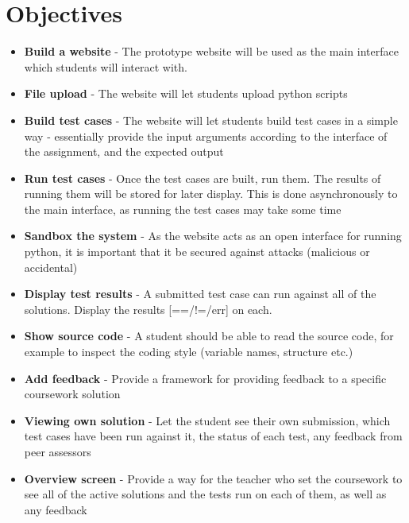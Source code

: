 \documentclass[a4paper,11pt]{report}
\newcommand{\objv}[2]{\item \textbf{#1} - #2}
\begin{document}
\section{Objectives}
\begin{itemize}
 \objv{Build a website}{The prototype website will be used as the main interface which students will interact with.}
 \objv{File upload}{The website will let students upload python scripts}
 \objv{Build test cases}{The website will let students build test cases in a simple way - essentially provide the input arguments according to the interface of the assignment, and the expected output}
 \objv{Run test cases}{Once the test cases are built, run them. The results of running them will be stored for later display. This is done asynchronously to the main interface, as running the test cases may take some time}
 \objv{Sandbox the system}{As the website acts as an open interface for running python, it is important that it be secured against attacks (malicious or accidental)}
 \objv{Display test results}{A submitted test case can run against all of the solutions. Display the results [==/!=/err] on each.}
 \objv{Show source code}{A student should be able to read the source code, for example to inspect the coding style (variable names, structure etc.)}
 \objv{Add feedback}{Provide a framework for providing feedback to a specific coursework solution}
 \objv{Viewing own solution}{Let the student see their own submission, which test cases have been run against it, the status of each test, any feedback from peer assessors}
 \objv{Overview screen}{Provide a way for the teacher who set the coursework to see all of the active solutions and the tests run on each of them, as well as any feedback}
\end{itemize}
\end{document}
